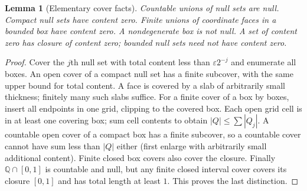 \documentclass[11pt,oneside,openany]{book}
\newtheorem{lemma}[theorem]{Lemma}
\theoremstyle{definition}
\theoremstyle{remark}
\newcommand{\Q}{\mathbb Q}
\newcommand{\eps}{\varepsilon}
\begin{document}
\begin{lemma}[Elementary cover facts]\label{d04:06:cover-facts}
Countable unions of null sets are null. Compact null sets have content zero. Finite unions of coordinate faces in a bounded box have content zero. A nondegenerate box is not null. A set of content zero has closure of content zero; bounded null sets need not have content zero.
\end{lemma}
\begin{proof}
Cover the $j$th null set with total content less than $\eps2^{-j}$ and enumerate all boxes. An open cover of a compact null set has a finite subcover, with the same upper bound for total content. A face is covered by a slab of arbitrarily small thickness; finitely many such slabs suffice.
For a finite cover of a box by boxes, insert all endpoints in one grid, clipping to the covered box. Each open grid cell is in at least one covering box; sum cell contents to obtain $|Q|\leq\sum|Q_j|$. A countable open cover of a compact box has a finite subcover, so a countable cover cannot have sum less than $|Q|$ either (first enlarge with arbitrarily small additional content). Finite closed box covers also cover the closure. Finally $\Q\cap[0,1]$ is countable and null, but any finite closed interval cover covers its closure $[0,1]$ and has total length at least $1$. This proves the last distinction.
\end{proof}
\end{document}
